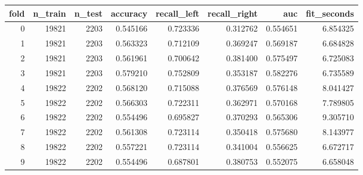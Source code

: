 \begin{tabular}{rrrrrrrr}
\toprule
fold & n_train & n_test & accuracy & recall_left & recall_right & auc & fit_seconds \\
\midrule
0 & 19821 & 2203 & 0.545166 & 0.723336 & 0.312762 & 0.554651 & 6.854325 \\
1 & 19821 & 2203 & 0.563323 & 0.712109 & 0.369247 & 0.569187 & 6.684828 \\
2 & 19821 & 2203 & 0.561961 & 0.700642 & 0.381400 & 0.575497 & 6.725083 \\
3 & 19821 & 2203 & 0.579210 & 0.752809 & 0.353187 & 0.582276 & 6.735589 \\
4 & 19822 & 2202 & 0.568120 & 0.715088 & 0.376569 & 0.576148 & 8.041427 \\
5 & 19822 & 2202 & 0.566303 & 0.722311 & 0.362971 & 0.570168 & 7.789805 \\
6 & 19822 & 2202 & 0.554496 & 0.695827 & 0.370293 & 0.565306 & 9.305710 \\
7 & 19822 & 2202 & 0.561308 & 0.723114 & 0.350418 & 0.575680 & 8.143977 \\
8 & 19822 & 2202 & 0.557221 & 0.723114 & 0.341004 & 0.556625 & 6.672717 \\
9 & 19822 & 2202 & 0.554496 & 0.687801 & 0.380753 & 0.552075 & 6.658048 \\
\bottomrule
\end{tabular}
